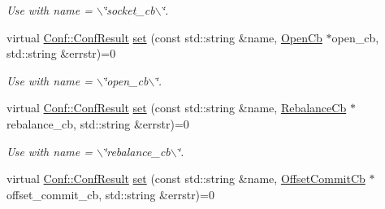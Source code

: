 \begin{DoxyCompactItemize}
\begin{DoxyCompactList}\small\item\em Use with {\ttfamily name} = {\ttfamily $\backslash$\char`\"{}socket\_\-cb$\backslash$\char`\"{}}. \item\end{DoxyCompactList}\item 
\hypertarget{classRdKafka_1_1Conf_aa630f9ad61a88d261f0ddf6f91b5e2e9}{
virtual \hyperlink{classRdKafka_1_1Conf_a1d023a689c09f42ab18b7bd1d15a11a6}{Conf::ConfResult} \hyperlink{classRdKafka_1_1Conf_aa630f9ad61a88d261f0ddf6f91b5e2e9}{set} (const std::string \&name, \hyperlink{classRdKafka_1_1OpenCb}{OpenCb} $\ast$open\_\-cb, std::string \&errstr)=0}
\label{classRdKafka_1_1Conf_aa630f9ad61a88d261f0ddf6f91b5e2e9}

\begin{DoxyCompactList}\small\item\em Use with {\ttfamily name} = {\ttfamily $\backslash$\char`\"{}open\_\-cb$\backslash$\char`\"{}}. \item\end{DoxyCompactList}\item 
\hypertarget{classRdKafka_1_1Conf_a6160e4cd43312a2fe1856f6aa671e92a}{
virtual \hyperlink{classRdKafka_1_1Conf_a1d023a689c09f42ab18b7bd1d15a11a6}{Conf::ConfResult} \hyperlink{classRdKafka_1_1Conf_a6160e4cd43312a2fe1856f6aa671e92a}{set} (const std::string \&name, \hyperlink{classRdKafka_1_1RebalanceCb}{RebalanceCb} $\ast$rebalance\_\-cb, std::string \&errstr)=0}
\label{classRdKafka_1_1Conf_a6160e4cd43312a2fe1856f6aa671e92a}

\begin{DoxyCompactList}\small\item\em Use with {\ttfamily name} = {\ttfamily $\backslash$\char`\"{}rebalance\_\-cb$\backslash$\char`\"{}}. \item\end{DoxyCompactList}\item 
\hypertarget{classRdKafka_1_1Conf_a1ad021fd3f4c374f5651435904b1a2dd}{
virtual \hyperlink{classRdKafka_1_1Conf_a1d023a689c09f42ab18b7bd1d15a11a6}{Conf::ConfResult} \hyperlink{classRdKafka_1_1Conf_a1ad021fd3f4c374f5651435904b1a2dd}{set} (const std::string \&name, \hyperlink{classRdKafka_1_1OffsetCommitCb}{OffsetCommitCb} $\ast$offset\_\-commit\_\-cb, std::string \&errstr)=0}
\label{classRdKafka_1_1Conf_a1ad021fd3f4c374f5651435904b1a2dd}


\end{DoxyCompactItemize}

